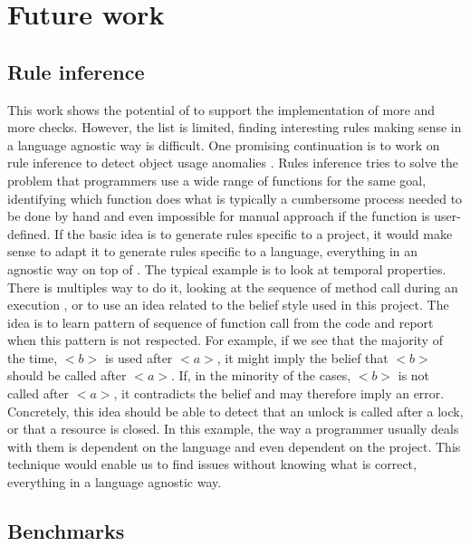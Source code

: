 \section{Future work}
\label{sec:future_work}

\subsection{Rule inference}
\label{subsec:rule_inference}

This work shows the potential of \slang{} to support the implementation of more and more checks.
However, the list is limited, finding interesting rules making sense in a language agnostic way is difficult. 
One promising continuation is to work on rule inference to detect object usage anomalies \cite{Wasylkowski:2007:DOU:1287624.1287632}. \newline
Rules inference tries to solve the problem that programmers use a wide range of functions for the same goal, identifying which function does what is typically a cumbersome process needed to be done by hand and even impossible for manual approach if the function is user-defined. 
If the basic idea is to generate rules specific to a project, it would make sense to adapt it to generate rules specific to a language, everything in an agnostic way on top of \slang{}.
The typical example is to look at temporal properties. 
There is multiples way to do it, looking at the sequence of method call during an execution \cite{Gabel:2010:OIE:1806799.1806806}, or to use an idea related to the belief style \cite{Engler:2001:BDB:502059.502041} used in this project. 
The idea is to learn pattern of sequence of function call from the code and report when this pattern is not respected.
For example, if we see that the majority of the time, \emph{$<b>$} is used after \emph{$<a>$}, it might imply the belief that \emph{$<b>$} should be called after \emph{$<a>$}. If, in the minority of the cases, \emph{$<b>$} is not called after \emph{$<a>$}, it contradicts the belief and may therefore imply an error. 
Concretely, this idea should be able to detect that an unlock is called after a lock, or that a resource is closed. 
In this example, the way a programmer usually deals with them is dependent on the language and even dependent on the project. \newline
This technique would enable us to find issues without knowing what is correct, everything in a language agnostic way.

\subsection{Benchmarks}
\label{subsec:benchmarks}

